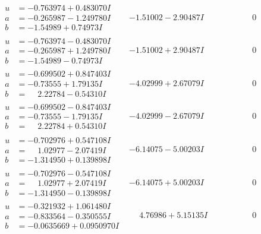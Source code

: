 \documentclass[1p]{elsarticle_modified}
\theoremstyle{definition}
\begin{document}
$$\begin{array}{c|c|c}
 \hline 
\begin{aligned}
u &= -0.763974 + 0.483070 I \\
a &= -0.265987 - 1.249780 I \\
b &= -1.54989 + 0.74973 I\end{aligned}
 & -1.51002 - 2.90487 I & \phantom{-0.000000 } 0 \\ \hline\begin{aligned}
u &= -0.763974 - 0.483070 I \\
a &= -0.265987 + 1.249780 I \\
b &= -1.54989 - 0.74973 I\end{aligned}
 & -1.51002 + 2.90487 I & \phantom{-0.000000 } 0 \\ \hline\begin{aligned}
u &= -0.699502 + 0.847403 I \\
a &= -0.73555 + 1.79135 I \\
b &= \phantom{-}2.22784 - 0.54310 I\end{aligned}
 & -4.02999 + 2.67079 I & \phantom{-0.000000 } 0 \\ \hline\begin{aligned}
u &= -0.699502 - 0.847403 I \\
a &= -0.73555 - 1.79135 I \\
b &= \phantom{-}2.22784 + 0.54310 I\end{aligned}
 & -4.02999 - 2.67079 I & \phantom{-0.000000 } 0 \\ \hline\begin{aligned}
u &= -0.702976 + 0.547108 I \\
a &= \phantom{-}1.02977 - 2.07419 I \\
b &= -1.314950 + 0.139898 I\end{aligned}
 & -6.14075 - 5.00203 I & \phantom{-0.000000 } 0 \\ \hline\begin{aligned}
u &= -0.702976 - 0.547108 I \\
a &= \phantom{-}1.02977 + 2.07419 I \\
b &= -1.314950 - 0.139898 I\end{aligned}
 & -6.14075 + 5.00203 I & \phantom{-0.000000 } 0 \\ \hline\begin{aligned}
u &= -0.321932 + 1.061480 I \\
a &= -0.833564 - 0.350555 I \\
b &= -0.0635669 + 0.0950970 I\end{aligned}
 & \phantom{-}4.76986 + 5.15135 I & \phantom{-0.000000 } 0 \\ \hline\begin{aligned}

\end{aligned}
\end{array}$$
\end{document}
